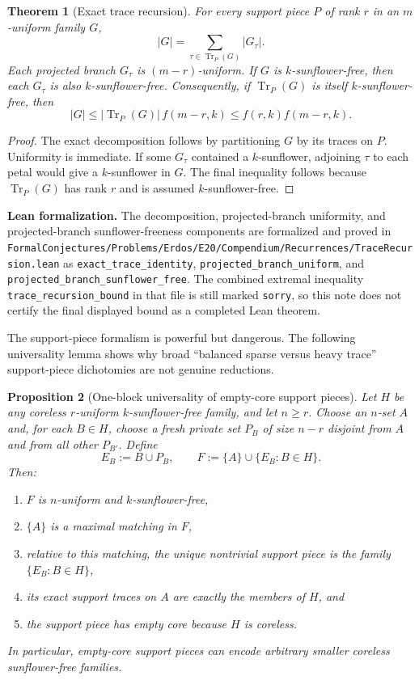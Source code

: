 \documentclass[11pt]{article}
\newtheorem{theorem}{Theorem}[section]
\newtheorem{proposition}[theorem]{Proposition}
\theoremstyle{definition}
\newcommand{\Tr}{\operatorname{Tr}}
\newcommand{\1}{\mathbf{1}}
\newcommand{\leannote}[1]{\par\smallskip\noindent\textbf{Lean formalization.} #1\par\smallskip}
\begin{document}
\begin{theorem}[Exact trace recursion]\label{thm:trace-recursion}
For every support piece $P$ of rank $r$ in an $m$-uniform family $G$,
\[
|G|=\sum_{\tau\in \Tr_P(G)} |G_\tau|.
\]
Each projected branch $G_\tau$ is $(m-r)$-uniform. If $G$ is $k$-sunflower-free, then each $G_\tau$ is also $k$-sunflower-free. Consequently, if $\Tr_P(G)$ is itself $k$-sunflower-free, then
\[
|G|\le |\Tr_P(G)|\,f(m-r,k)\le f(r,k)f(m-r,k).
\]
\end{theorem}

\begin{proof}
The exact decomposition follows by partitioning $G$ by its traces on $P$. Uniformity is immediate. If some $G_\tau$ contained a $k$-sunflower, adjoining $\tau$ to each petal would give a $k$-sunflower in $G$. The final inequality follows because $\Tr_P(G)$ has rank $r$ and is assumed $k$-sunflower-free.
\end{proof}

\leannote{The decomposition, projected-branch uniformity, and projected-branch sunflower-freeness components are formalized and proved in \texttt{FormalConjectures/Problems/Erdos/E20/Compendium/Recurrences/TraceRecursion.lean} as \texttt{exact\_trace\_identity}, \texttt{projected\_branch\_uniform}, and \texttt{projected\_branch\_sunflower\_free}. The combined extremal inequality \texttt{trace\_recursion\_bound} in that file is still marked \texttt{sorry}, so this note does not certify the final displayed bound as a completed Lean theorem.}

The support-piece formalism is powerful but dangerous. The following universality lemma shows why broad ``balanced sparse versus heavy trace'' support-piece dichotomies are not genuine reductions.

\begin{proposition}[One-block universality of empty-core support pieces]\label{prop:one-block-universality}
Let $H$ be any coreless $r$-uniform $k$-sunflower-free family, and let $n\ge r$. Choose an $n$-set $A$ and, for each $B\in H$, choose a fresh private set $P_B$ of size $n-r$ disjoint from $A$ and from all other $P_{B'}$. Define
\[
E_B:=B\cup P_B,
\qquad
F:=\{A\}\cup\{E_B:B\in H\}.
\]
Then:
\begin{enumerate}[label=(\roman*),leftmargin=2.2em]
\item $F$ is $n$-uniform and $k$-sunflower-free,
\item $\{A\}$ is a maximal matching in $F$,
\item relative to this matching, the unique nontrivial support piece is the family $\{E_B:B\in H\}$,
\item its exact support traces on $A$ are exactly the members of $H$, and
\item the support piece has empty core because $H$ is coreless.
\end{enumerate}
In particular, empty-core support pieces can encode arbitrary smaller coreless sunflower-free families.
\end{proposition}
\end{document}
